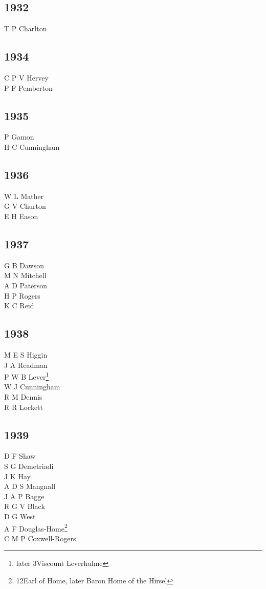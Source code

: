 \begin{multicols}{3}
  \subsection*{1932}
  T P Charlton \\
  \subsection*{1934}
  C P V Hervey \\
  P F Pemberton \\
  \subsection*{1935}
  P Gamon \\
  H C Cunningham \\
  \subsection*{1936}
  W L Mather \\
  G V Churton \\
  E H Eason \\
  \subsection*{1937}
  G B Dawson \\
  M N Mitchell \\
  A D Paterson \\
  H P Rogers \\
  K C Reid \\
  \subsection*{1938}
  M E S Higgin \\
  J A Readman \\
  P W B Lever\footnote{later 3\rd Viscount Leverhulme} \\
  W J Cunningham \\
  R M Dennis \\
  R R Lockett \\
  \subsection*{1939}
  D F Shaw \\
  S G Demetriadi \\
  J K Hay \\
  A D S Mangnall \\
  J A P Bagge \\
  R G V Black \\
  D G West \\
  A F Douglas-Home\footnote{12\nth Earl of Home, later Baron Home of the Hirsel} \\
  C M P Coxwell-Rogers \\

\end{multicols}
